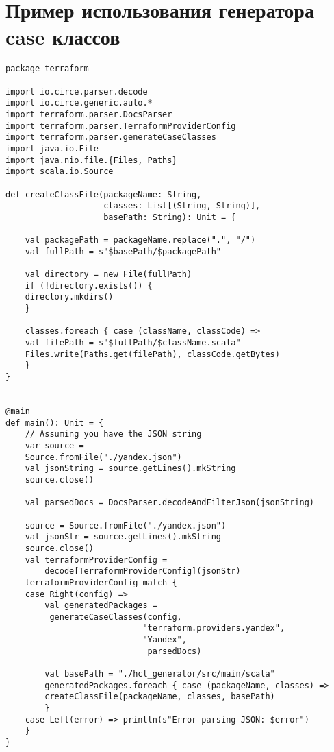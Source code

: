 ﻿\chapter{Пример использования генератора case классов}\label{sec:appendix6}

\begin{verbatim}
package terraform

import io.circe.parser.decode
import io.circe.generic.auto.*
import terraform.parser.DocsParser
import terraform.parser.TerraformProviderConfig
import terraform.parser.generateCaseClasses
import java.io.File
import java.nio.file.{Files, Paths}
import scala.io.Source

def createClassFile(packageName: String,
                    classes: List[(String, String)],
                    basePath: String): Unit = {

    val packagePath = packageName.replace(".", "/")
    val fullPath = s"$basePath/$packagePath"

    val directory = new File(fullPath)
    if (!directory.exists()) {
    directory.mkdirs()
    }

    classes.foreach { case (className, classCode) =>
    val filePath = s"$fullPath/$className.scala"
    Files.write(Paths.get(filePath), classCode.getBytes)
    }
}


@main
def main(): Unit = {
    // Assuming you have the JSON string
    var source = 
    Source.fromFile("./yandex.json")
    val jsonString = source.getLines().mkString
    source.close()

    val parsedDocs = DocsParser.decodeAndFilterJson(jsonString)

    source = Source.fromFile("./yandex.json")
    val jsonStr = source.getLines().mkString
    source.close()
    val terraformProviderConfig = 
        decode[TerraformProviderConfig](jsonStr)
    terraformProviderConfig match {
    case Right(config) =>
        val generatedPackages =
         generateCaseClasses(config,
                            "terraform.providers.yandex",
                            "Yandex",
                             parsedDocs)

        val basePath = "./hcl_generator/src/main/scala"
        generatedPackages.foreach { case (packageName, classes) =>
        createClassFile(packageName, classes, basePath)
        }
    case Left(error) => println(s"Error parsing JSON: $error")
    }
}
\end{verbatim}
